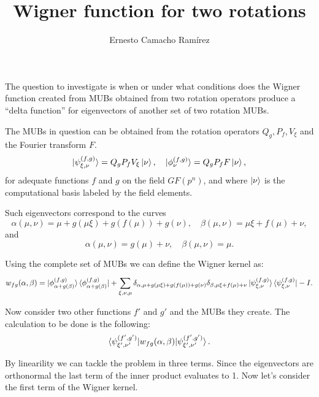 \documentclass[a4paper]{article}
\title{Wigner function for two rotations}
\author{Ernesto Camacho Ramírez}
\begin{document}
  \maketitle
  
  The question to investigate is when or under what
  conditions does the Wigner function created from MUBs
  obtained from two rotation operators produce a ``delta
  function'' for eigenvectors of another set of two rotation
  MUBs.

  The MUBs in question can be obtained from the rotation
  operators $Q_g, P_f, V_\xi$ and the Fourier transform $F$.
  \begin{equation}
    \ket{\psi_{\xi,\nu}^{(f,g)}}
    = Q_g P_f V_\xi \ket{\nu},
    \quad
    \ket{\phi_{\nu}^{(f,g)}} 
    = Q_g P_f F \ket{\nu},
  \end{equation}
  for adequate functions $f$ and $g$ on the field
  $GF(p^{n})$, and where $\ket\nu$ is the computational
  basis labeled by the field elements.

  Such eigenvectors correspond to the curves
  \begin{equation}
    \alpha(\mu,\nu)
    = \mu + g(\mu\xi) + g(f(\mu)) + g(\nu),
    \quad
    \beta(\mu,\nu)
    = \mu\xi + f(\mu) + \nu,
  \end{equation}
  and
  \begin{equation}
    \alpha(\mu,\nu) = g(\mu) + \nu,
    \quad
    \beta(\mu,\nu) = \mu.
  \end{equation}

  Using the complete set of MUBs we can define the Wigner
  kernel as:
  \begin{equation}
    w_{fg}(\alpha,\beta)
    = \ket{\phi_{\alpha + g(\beta)}^{(f,g)}}
    \bra{\phi_{\alpha + g(\beta)}^{(f,g)}}
    + \sum_{\xi,\nu,\mu}^{} \delta_{\alpha,\mu+g(\mu\xi) +
    g(f(\mu)) + g(\nu)} \delta_{\beta,\mu\xi+f(\mu)+\nu}
    \ket{\psi_{\xi,\nu}^{(f,g)}}
    \bra{\psi_{\xi,\nu}^{(f,g)}}
    - I.
  \end{equation}

  Now consider two other functions $f'$ and $g'$ and the
  MUBs they create. The calculation to be done is the
  following:
  \begin{equation}
    \braket{
      \psi_{\xi',\nu'}^{(f',g')}
      |w_{fg}(\alpha,\beta)|
      \psi_{\xi',\nu'}^{(f',g')}
    }.
  \end{equation}

  By linearility we can tackle the problem in three terms.
  Since the eigenvectors are orthonormal the last term of
  the inner product evaluates to 1. Now let's consider the
  first term of the Wigner kernel.
\end{document}
